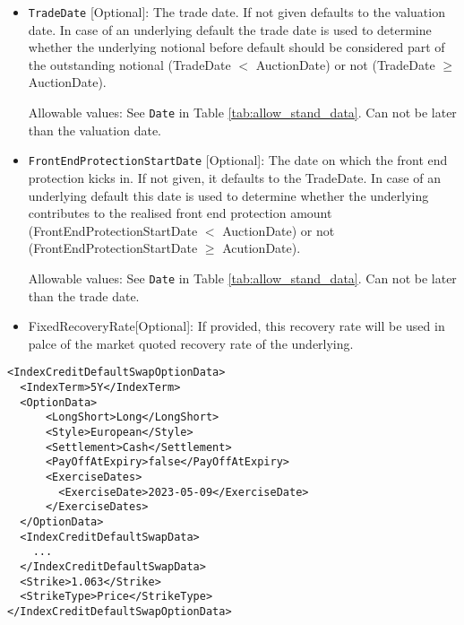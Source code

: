 \begin{itemize}
\item 
\lstinline!TradeDate! [Optional]: The trade date. If not given defaults to the valuation date. In case of an underlying
default the trade date is used to determine whether the underlying notional before default should be considered part of
the outstanding notional (TradeDate $<$ AuctionDate) or not (TradeDate $\geq$ AuctionDate).
 
Allowable values: See \lstinline!Date! in Table \ref{tab:allow_stand_data}. Can not be later than the valuation date.
 
\item 
\lstinline!FrontEndProtectionStartDate! [Optional]: The date on which the front end protection kicks in. If not given,
it defaults to the TradeDate. In case of an underlying default this date is used to determine whether the underlying
contributes to the realised front end protection amount (FrontEndProtectionStartDate $<$ AuctionDate) or not
(FrontEndProtectionStartDate $\geq$ AcutionDate).
 
Allowable values: See \lstinline!Date! in Table \ref{tab:allow_stand_data}. Can not be later than the trade date.
 
\item FixedRecoveryRate[Optional]: If provided, this recovery rate will be used in palce of the market quoted recovery rate of the underlying.
  
\end{itemize}

\begin{listing}[H]
\begin{verbatim}
<IndexCreditDefaultSwapOptionData>
  <IndexTerm>5Y</IndexTerm>
  <OptionData>
      <LongShort>Long</LongShort>
      <Style>European</Style>
      <Settlement>Cash</Settlement>
      <PayOffAtExpiry>false</PayOffAtExpiry>
      <ExerciseDates>
        <ExerciseDate>2023-05-09</ExerciseDate>
      </ExerciseDates>
  </OptionData>
  <IndexCreditDefaultSwapData>
    ... 
  </IndexCreditDefaultSwapData>
  <Strike>1.063</Strike>
  <StrikeType>Price</StrikeType>
</IndexCreditDefaultSwapOptionData>
\end{verbatim}
\caption{Example Structure of \lstinline!IndexCreditDefaultSwapOptionData! node.}
\label{lst:indexcdsoptiondata}
\end{listing}


